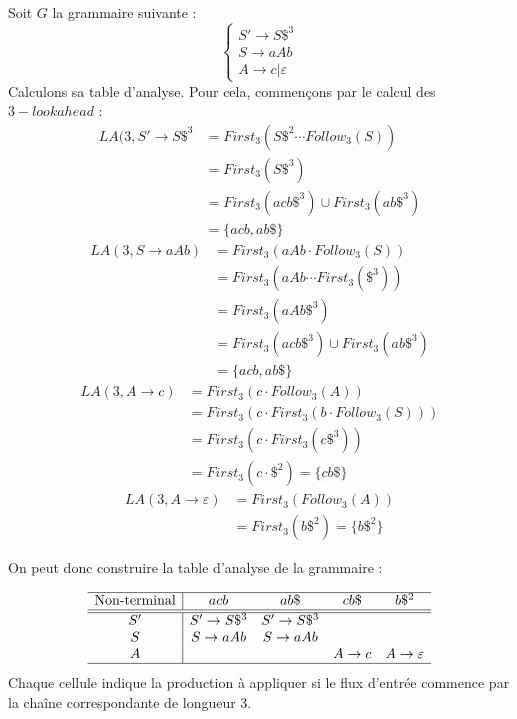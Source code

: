 \begin{example}
    Soit $G$ la grammaire suivante : 
        $$ 
            \begin{cases}
                S' \to S\$^3 \\ 
                S \to aAb \\ 
                A \to c | \varepsilon 
            \end{cases}
        $$
    Calculons sa table d'analyse. Pour cela, commençons par le calcul des $3-lookahead$ : 
        \begin{align*}
            LA(3, S' \to S\$^3 &= First_3(S\$^2 \cdots Follow_3(S)) \\ 
            &= First_3(S\$^3) \\
            &= First_3(acb\$^3) \cup First_3(ab\$^3) \\ 
            &= \{acb, ab\$\}
        \end{align*}
        \begin{align*}
            LA(3, S \to aAb) &= First_3(aAb \cdot Follow_3(S)) \\ 
            &= First_3(aAb \cdots First_3(\$^3)) \\ 
            &= First_3(aAb\$^3) \\ 
            &= First_3(acb\$^3) \cup First_3(ab\$^3) \\ 
            &= \{acb, ab\$\}
        \end{align*}
        \begin{align*}
            LA(3, A \to c) &= First_3(c \cdot Follow_3(A)) \\ 
            &= First_3(c \cdot First_3(b \cdot Follow_3(S))) \\ 
            &= First_3(c \cdot First_3(c\$^3)) \\ 
            &= First_3(c \cdot \$^2) = \{cb\$\}
        \end{align*}
        \begin{align*}
            LA(3, A \to \varepsilon) &= First_3(Follow_3(A)) \\ 
            &= First_3(b\$^2) = \{b\$^2\}
        \end{align*}
    
    On peut donc construire la table d'analyse de la grammaire : 

        \[
            \begin{array}{c|cccc}
                \hline 
                \text{Non-terminal} & acb & ab\$ & cb\$ & b\$^2 \\ 
                \hline 
                \hline
                S' & S' \to S\$^3 & S' \to S\$^3 & & \\ 
                S  & S \to aAb  & S \to aAb  & & \\ 
                A  &            &           & A \to c & A \to \varepsilon\\
                \hline 
            \end{array}
        \]
    Chaque cellule indique la production à appliquer si le flux d'entrée commence par la 
    chaîne correspondante de longueur 3.
\end{example}

